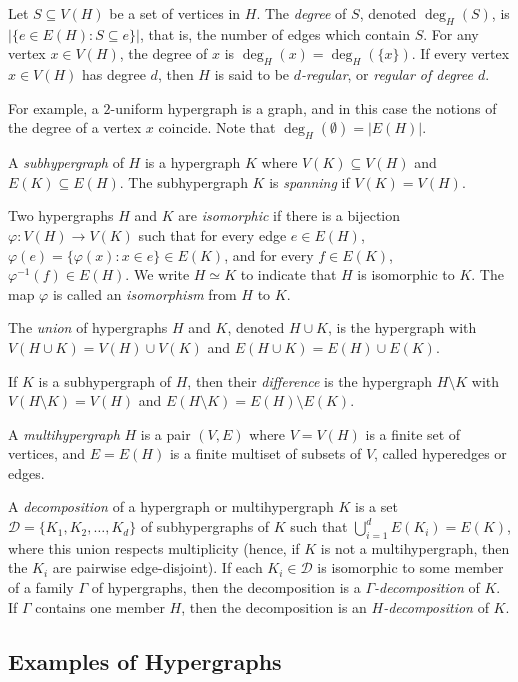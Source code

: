 Let $S \subseteq V(H)$ be a set of vertices in $H$. The {\em degree} of $S$,
denoted $\deg_H(S)$, is $|\{e \in E(H) : S \subseteq e\}|$, that is, the number
of edges which contain $S$.
For any vertex $x \in V(H)$, the degree of $x$ is $\deg_H(x) = \deg_H(\{x\})$.
If every vertex $x \in V(H)$ has degree $d$, then $H$ is said to be {\em $d$-regular}, or {\em regular of degree $d$}.

For example, a $2$-uniform hypergraph is a graph, and in this case the notions
of the degree of a vertex $x$ coincide. Note that $\deg_H(\emptyset) = |E(H)|$.

A {\em subhypergraph} of $H$ is a hypergraph $K$ where $V(K) \subseteq V(H)$ and $E(K) \subseteq E(H)$. The subhypergraph $K$ is {\em spanning} if $V(K) = V(H)$.

Two hypergraphs $H$ and $K$ are {\em isomorphic} if there is a bijection
$\varphi : V(H) \to V(K)$ such that for every edge $e \in E(H)$,
$\varphi(e) = \{\varphi(x) : x \in e\} \in E(K)$, and for every
$f \in E(K)$, $\varphi^{-1}(f) \in E(H)$.
We write $H \simeq K$ to indicate that $H$ is isomorphic to $K$.
The map $\varphi$ is called an {\em isomorphism} from $H$ to $K$.

The {\em union} of hypergraphs $H$ and $K$, denoted
$H \cup K$, is the hypergraph with $V(H \cup K) = V(H) \cup V(K)$ and
$E(H \cup K) = E(H) \cup E(K)$.

If $K$ is a subhypergraph of $H$, then their {\em difference}
is the hypergraph $H \setminus K$ with $V(H \setminus K) = V(H)$ and
$E(H \setminus K) = E(H) \setminus E(K)$.

A {\em multihypergraph} $H$ is a pair $(V, E)$ where $V = V(H)$ is a finite set
of vertices, and $E = E(H)$ is a finite multiset of subsets of $V$, called
hyperedges or edges.

A {\em decomposition} of a hypergraph or multihypergraph $K$ is a set $\mathcal{D} = \{K_1,
K_2, \ldots, K_d\}$ of subhypergraphs of $K$ such that
$\bigcup_{i=1}^d E(K_i) = E(K)$, where this union respects multiplicity (hence, if $K$ is not a multihypergraph, then the $K_i$ are pairwise edge-disjoint).
If each $K_i \in \mathcal{D}$ is isomorphic to some member
of a family $\Gamma$ of hypergraphs, then the decomposition is a {\em
$\Gamma$-decomposition} of $K$. If $\Gamma$ contains one member $H$, then the
decomposition is an {\em $H$-decomposition} of $K$.

\subsection{Examples of Hypergraphs}

